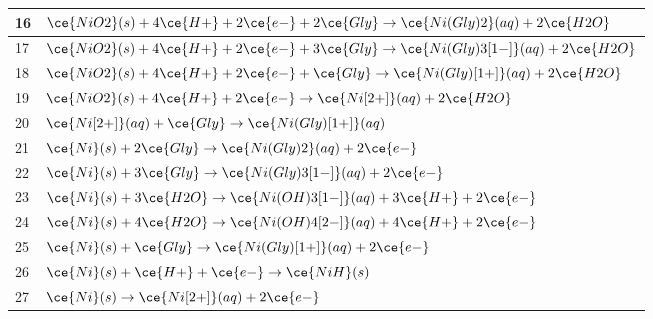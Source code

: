 \begin{longtable}{|p{0.9cm}|p{13.3cm}|}
16 & $\ce{NiO2}(s) + 4 \ce{H+} + 2 \ce{e-} + 2 \ce{Gly} \rightarrow \ce{Ni(Gly)2}(aq) + 2 \ce{H2O}$ \\ \hline
17 & $\ce{NiO2}(s) + 4 \ce{H+} + 2 \ce{e-} + 3 \ce{Gly} \rightarrow \ce{Ni(Gly)3[1-]}(aq) + 2 \ce{H2O}$ \\ \hline
18 & $\ce{NiO2}(s) + 4 \ce{H+} + 2 \ce{e-} + \ce{Gly} \rightarrow \ce{Ni(Gly)[1+]}(aq) + 2 \ce{H2O}$ \\ \hline
19 & $\ce{NiO2}(s) + 4 \ce{H+} + 2 \ce{e-} \rightarrow \ce{Ni[2+]}(aq) + 2 \ce{H2O}$ \\ \hline
20 & $\ce{Ni[2+]}(aq) + \ce{Gly} \rightarrow \ce{Ni(Gly)[1+]}(aq)$ \\ \hline
21 & $\ce{Ni}(s) + 2 \ce{Gly} \rightarrow \ce{Ni(Gly)2}(aq) + 2 \ce{e-}$ \\ \hline
22 & $\ce{Ni}(s) + 3 \ce{Gly} \rightarrow \ce{Ni(Gly)3[1-]}(aq) + 2 \ce{e-}$ \\ \hline
23 & $\ce{Ni}(s) + 3 \ce{H2O} \rightarrow \ce{Ni(OH)3[1-]}(aq) + 3 \ce{H+} + 2 \ce{e-}$ \\ \hline
24 & $\ce{Ni}(s) + 4 \ce{H2O} \rightarrow \ce{Ni(OH)4[2-]}(aq) + 4 \ce{H+} + 2 \ce{e-}$ \\ \hline
25 & $\ce{Ni}(s) + \ce{Gly} \rightarrow \ce{Ni(Gly)[1+]}(aq) + 2 \ce{e-}$ \\ \hline
26 & $\ce{Ni}(s) + \ce{H+} + \ce{e-} \rightarrow \ce{NiH}(s)$ \\ \hline
27 & $\ce{Ni}(s) \rightarrow \ce{Ni[2+]}(aq) + 2 \ce{e-}$ \\ \hline
\end{longtable}
